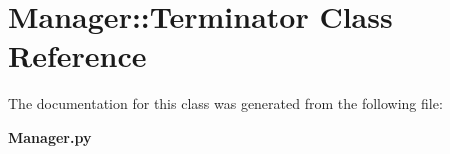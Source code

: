 \section{Manager::Terminator Class Reference}
\label{classManager_1_1Terminator}


The documentation for this class was generated from the following file:\begin{CompactItemize}
\item 
{\bf Manager.py}\end{CompactItemize}
